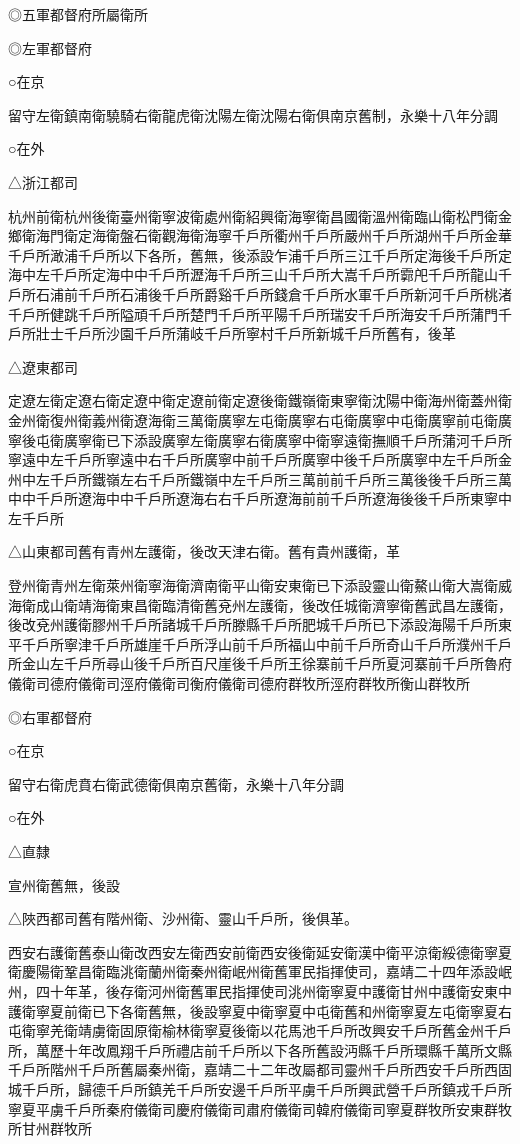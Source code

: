 ◎五軍都督府所屬衛所

◎左軍都督府

○在京

留守左衛鎮南衛驍騎右衛龍虎衛沈陽左衛沈陽右衛俱南京舊制，永樂十八年分調

○在外

△浙江都司

杭州前衛杭州後衛臺州衛寧波衛處州衛紹興衛海寧衛昌國衛溫州衛臨山衛松門衛金鄉衛海門衛定海衛盤石衛觀海衛海寧千戶所衢州千戶所嚴州千戶所湖州千戶所金華千戶所澉浦千戶所以下各所，舊無，後添設乍浦千戶所三江千戶所定海後千戶所定海中左千戶所定海中中千戶所瀝海千戶所三山千戶所大嵩千戶所霩戺千戶所龍山千戶所石浦前千戶所石浦後千戶所爵谿千戶所錢倉千戶所水軍千戶所新河千戶所桃渚千戶所健跳千戶所隘頑千戶所楚門千戶所平陽千戶所瑞安千戶所海安千戶所蒲門千戶所壯士千戶所沙園千戶所蒲岐千戶所寧村千戶所新城千戶所舊有，後革

△遼東都司

定遼左衛定遼右衛定遼中衛定遼前衛定遼後衛鐵嶺衛東寧衛沈陽中衛海州衛蓋州衛金州衛復州衛義州衛遼海衛三萬衛廣寧左屯衛廣寧右屯衛廣寧中屯衛廣寧前屯衛廣寧後屯衛廣寧衛已下添設廣寧左衛廣寧右衛廣寧中衛寧遠衛撫順千戶所蒲河千戶所寧遠中左千戶所寧遠中右千戶所廣寧中前千戶所廣寧中後千戶所廣寧中左千戶所金州中左千戶所鐵嶺左右千戶所鐵嶺中左千戶所三萬前前千戶所三萬後後千戶所三萬中中千戶所遼海中中千戶所遼海右右千戶所遼海前前千戶所遼海後後千戶所東寧中左千戶所

△山東都司舊有青州左護衛，後改天津右衛。舊有貴州護衛，革

登州衛青州左衛萊州衛寧海衛濟南衛平山衛安東衛已下添設靈山衛鰲山衛大嵩衛威海衛成山衛靖海衛東昌衛臨清衛舊兗州左護衛，後改任城衛濟寧衛舊武昌左護衛，後改兗州護衛膠州千戶所諸城千戶所滕縣千戶所肥城千戶所已下添設海陽千戶所東平千戶所寧津千戶所雄崖千戶所浮山前千戶所福山中前千戶所奇山千戶所濮州千戶所金山左千戶所尋山後千戶所百尺崖後千戶所王徐寨前千戶所夏河寨前千戶所魯府儀衛司德府儀衛司涇府儀衛司衡府儀衛司德府群牧所涇府群牧所衡山群牧所

◎右軍都督府

○在京

留守右衛虎賁右衛武德衛俱南京舊衛，永樂十八年分調

○在外

△直隸

宣州衛舊無，後設

△陜西都司舊有階州衛、沙州衛、靈山千戶所，後俱革。

西安右護衛舊泰山衛改西安左衛西安前衛西安後衛延安衛漢中衛平涼衛綏德衛寧夏衛慶陽衛鞏昌衛臨洮衛蘭州衛秦州衛岷州衛舊軍民指揮使司，嘉靖二十四年添設岷州，四十年革，後存衛河州衛舊軍民指揮使司洮州衛寧夏中護衛甘州中護衛安東中護衛寧夏前衛已下各衛舊無，後設寧夏中衛寧夏中屯衛舊和州衛寧夏左屯衛寧夏右屯衛寧羌衛靖虜衛固原衛榆林衛寧夏後衛以花馬池千戶所改興安千戶所舊金州千戶所，萬歷十年改鳳翔千戶所禮店前千戶所以下各所舊設沔縣千戶所環縣千萬所文縣千戶所階州千戶所舊屬秦州衛，嘉靖二十二年改屬都司靈州千戶所西安千戶所西固城千戶所，歸德千戶所鎮羌千戶所安邊千戶所平虜千戶所興武營千戶所鎮戎千戶所寧夏平虜千戶所秦府儀衛司慶府儀衛司肅府儀衛司韓府儀衛司寧夏群牧所安東群牧所甘州群牧所

